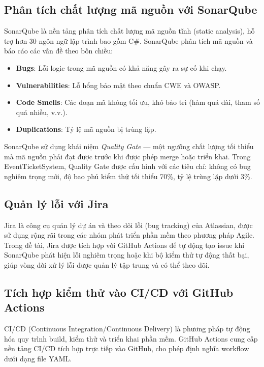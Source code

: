 \documentclass[../main.tex]{subfiles}
\begin{document}
\subsection{Phân tích chất lượng mã nguồn với SonarQube}

SonarQube là nền tảng phân tích chất lượng mã nguồn tĩnh (static analysis), hỗ trợ hơn 30 ngôn ngữ lập trình bao gồm C\#. SonarQube phân tích mã nguồn và báo cáo các vấn đề theo bốn chiều:

\begin{itemize}
    \item \textbf{Bugs}: Lỗi logic trong mã nguồn có khả năng gây ra sự cố khi chạy.
    \item \textbf{Vulnerabilities}: Lỗ hổng bảo mật theo chuẩn CWE và OWASP.
    \item \textbf{Code Smells}: Các đoạn mã không tối ưu, khó bảo trì (hàm quá dài, tham số quá nhiều, v.v.).
    \item \textbf{Duplications}: Tỷ lệ mã nguồn bị trùng lặp.
\end{itemize}

SonarQube sử dụng khái niệm \textit{Quality Gate} — một ngưỡng chất lượng tối thiểu mà mã nguồn phải đạt được trước khi được phép merge hoặc triển khai. Trong EventTicketSystem, Quality Gate được cấu hình với các tiêu chí: không có bug nghiêm trọng mới, độ bao phủ kiểm thử tối thiểu 70\%, tỷ lệ trùng lặp dưới 3\%.

\subsection{Quản lý lỗi với Jira}

Jira là công cụ quản lý dự án và theo dõi lỗi (bug tracking) của Atlassian, được sử dụng rộng rãi trong các nhóm phát triển phần mềm theo phương pháp Agile. Trong đề tài, Jira được tích hợp với GitHub Actions để tự động tạo issue khi SonarQube phát hiện lỗi nghiêm trọng hoặc khi bộ kiểm thử tự động thất bại, giúp vòng đời xử lý lỗi được quản lý tập trung và có thể theo dõi.

\subsection{Tích hợp kiểm thử vào CI/CD với GitHub Actions}

CI/CD (Continuous Integration/Continuous Delivery) là phương pháp tự động hóa quy trình build, kiểm thử và triển khai phần mềm. GitHub Actions cung cấp nền tảng CI/CD tích hợp trực tiếp vào GitHub, cho phép định nghĩa workflow dưới dạng file YAML.
\end{document}
